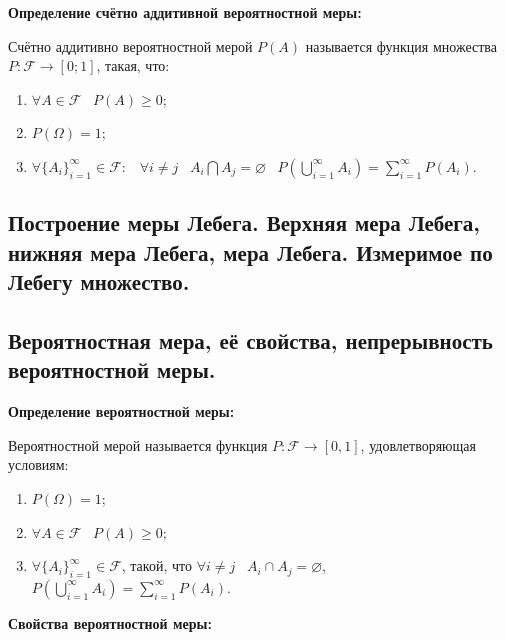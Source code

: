 \textbf{Определение счётно аддитивной 
вероятностной меры:}
    \smallskip

    Счётно аддитивно вероятностной мерой $P(A)$
    называется функция множества $P: \mathcal{F}
    \rightarrow [0; 1]$, такая, что:

    \begin{enumerate}
        \item{$\forall A \in \mathcal{F} \;\;\;
        P(A) \geq 0$;}
        \item{$P(\Omega) = 1$;}
        \item{$\forall \{A_i\}_{i = 1}^{\infty}
        \in \mathcal{F} : \;\;\; \forall
        i \neq j \;\;\; A_i \bigcap A_j = 
        \varnothing \;\;\; P\left(\bigcup\limits_{i = 1}^{
        \infty} A_i\right) = \sum_{i = 1}^{\infty}
        P(A_i)$.}
    \end{enumerate}
    \bigskip  

\subsection{Построение меры Лебега. Верхняя мера Лебега, нижняя мера Лебега, мера
Лебега. Измеримое по Лебегу множество.}    

\subsection{Вероятностная мера, её свойства, непрерывность вероятностной меры.}

\textbf{Определение вероятностной меры:}
    \smallskip

    Вероятностной мерой называется функция $P : \mathcal{F} \to [0, 1]$,
    удовлетворяющая условиям:

    \begin{enumerate}
        \item{$P(\Omega) = 1$;}
        \item{$\forall A \in \mathcal{F} \;\;\; P(A) \geq 0$;}
        \item{$\forall \{A_i\}^{\infty}_{i = 1} \in \mathcal{F}$,
        такой, что $\forall i \neq j \;\;\; A_i \cap A_j = \varnothing$,
        $P\left(\bigcup\limits^{\infty}_{i = 1}A_i\right) = \sum\limits^{\infty}_{i = 1} P(A_i)$.}
    \end{enumerate}
    \bigskip

\textbf{Свойства вероятностной меры:}    
    \smallskip

